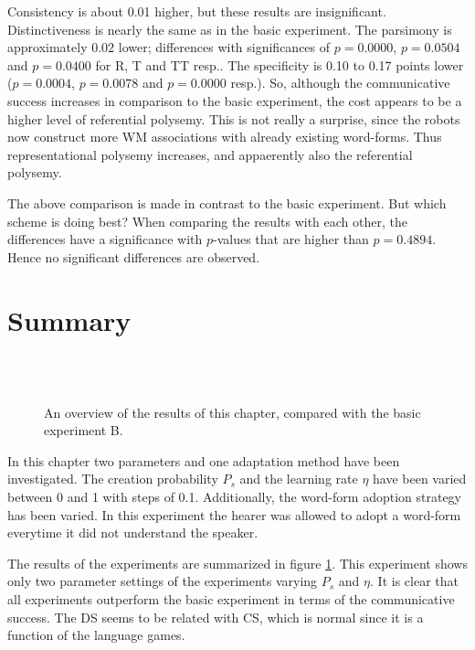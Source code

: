 Consistency is about 0.01 higher, but these results are insignificant. Distinctiveness is nearly the same as in the basic experiment. The parsimony is approximately 0.02 lower; differences with significances of $p=0.0000$, $p=0.0504$ and $p=0.0400$ for R, T and TT resp.. The specificity is 0.10 to 0.17 points lower ($p=0.0004$, $p=0.0078$ and $p=0.0000$ resp.). So, although the communicative success increases in comparison to the basic experiment, the cost appears to be a higher level of referential polysemy. This is not really a surprise, since the robots now construct more WM associations with already existing word-forms. Thus representational polysemy increases, and appaerently also the referential polysemy.

The above comparison is made in contrast to the basic experiment. But which scheme is doing best? When comparing the results with each other, the differences have a significance with $p$-values that are higher than $p=0.4894$. Hence no significant differences are observed.

\section{Summary}

\begin{figure}
\centering
{}
\\
\\
\caption{An overview of the results of this chapter, compared with the basic experiment B.}
\label{f:lex:results}
\end{figure}

In this chapter two parameters and one adaptation method have been investigated. The creation probability $P_s$ and the learning rate $\eta$ have been varied between 0 and 1 with steps of 0.1. Additionally, the word-form adoption strategy has been varied. In this experiment the hearer was allowed to adopt a word-form everytime it did not understand the speaker. 

The results of the experiments are summarized in figure \ref{f:lex:results}. This experiment shows only two parameter settings of the experiments varying $P_s$ and $\eta$. It is clear that all experiments outperform the basic experiment in terms of the communicative success. The DS seems to be related with CS, which is normal since it is a function of the language games. 

